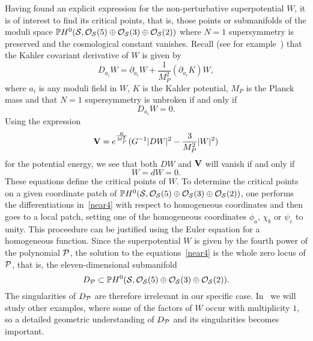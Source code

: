 \documentclass[a4paper,12pt]{article}
\numberwithin{equation}{section}
\theoremstyle{plain}
\begin{document}
Having found an explicit expression for the non-perturbative
superpotential
$W$, it is of interest to find its critical points, that is, those points
or
submanifolds of the moduli space ${\mathbb P}H^{0}
({\cal S}, {\cal O}_{{\cal S}}(5) \oplus {\cal O}_{{\cal S}}(3) \oplus
{\cal O}_{{\cal S}}(2))$ where $N=1$ supersymmetry is preserved and the
cosmological constant vanishes. Recall (see
for example~\cite{WB}) that the Kahler covariant derivative of $W$ is
given by
%
\begin{equation}
D_{a_{i}}W=\partial_{a_{i}}W+\frac{1}{M_{P}^{2}}(\partial_{a_{i}}K)W,
\label{near}
\end{equation}
%
where $a_{i}$ is any moduli field in $W$, $K$ is the Kahler potential,
$M_{P}$
is the Planck mass and
that $N=1$ supersymmetry is unbroken if and only if
%
\begin{equation}
D_{a_{i}}W=0.
\label{near2}
\end{equation}
%
Using the expression
%
\begin{equation}
{\bf V
\rm}=e^{\frac{K}{M_{P}^{2}}}(G^{-1}|DW|^{2}-\frac{3}{M_{P}^{2}}|W|^{2})
\label{near3}
\end{equation}
%
for the potential energy, we see that both $DW$ and ${\bf V \rm}$ will
vanish
if and only if
%
\begin{equation}
W=dW=0.
\label{near4}
\end{equation}
%
These equations define the critical points of $W$.
To determine the critical points on a given coordinate patch
of ${\mathbb P}H^{0}
({\cal S}, {\cal O}_{{\cal S}}(5) \oplus {\cal O}_{{\cal S}}(3) \oplus
{\cal O}_{{\cal S}}(2))$, one performs the
differentiations in~\eqref{near4} with respect to homogeneous coordinates
and then goes to a local patch,
setting one of the homogeneous coordinates $\phi_a$, $\chi_b$ or $\psi_c$
to
unity. This proceedure can be justified using the Euler equation
for a homogeneous function. Since the superpotential $W$ is given
by the fourth power of the polynomial ${\cal P}$,
the solution to
the equations~\eqref{near4} is the whole zero locus of ${\cal P}$, that is,
the eleven-dimensional submanifold
%
\begin{equation}
D_{\cal P}
\subset {\mathbb P}H^{0}
({\cal S}, {\cal O}_{{\cal S}}(5) \oplus {\cal O}_{{\cal S}}(3) \oplus
{\cal O}_{{\cal S}}(2)).
\label{final1}
\end{equation}
%
The singularities of $D_{\cal P}$ are therefore irrelevant in our specific case.
In~\cite{BDOnew} we will study other examples, where some of the factors of
$W$ occur with multiplicity $1$, so a detailed geometric understanding of
$D_{\cal P}$ and its singularities becomes important.
\end{document}
